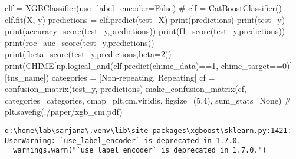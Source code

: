 \documentclass[
  letterpaper,
  DIV=11,
  numbers=noendperiod]{scrartcl}
\newenvironment{Shaded}{\begin{snugshade}}{\end{snugshade}}
\newcommand{\BuiltInTok}[1]{\textcolor[rgb]{0.00,0.23,0.31}{#1}}
\newcommand{\CommentTok}[1]{\textcolor[rgb]{0.37,0.37,0.37}{#1}}
\newcommand{\DecValTok}[1]{\textcolor[rgb]{0.68,0.00,0.00}{#1}}
\newcommand{\NormalTok}[1]{\textcolor[rgb]{0.00,0.23,0.31}{#1}}
\newcommand{\OperatorTok}[1]{\textcolor[rgb]{0.37,0.37,0.37}{#1}}
\newcommand{\StringTok}[1]{\textcolor[rgb]{0.13,0.47,0.30}{#1}}
\newcommand{\VariableTok}[1]{\textcolor[rgb]{0.07,0.07,0.07}{#1}}
\begin{document}
\begin{Shaded}
\begin{Highlighting}[]
\NormalTok{clf }\OperatorTok{=}\NormalTok{ XGBClassifier(use\_label\_encoder}\OperatorTok{=}\VariableTok{False}\NormalTok{)}
\CommentTok{\# clf = CatBoostClassifier()}
\NormalTok{clf.fit(X, y)}
\NormalTok{predictions }\OperatorTok{=}\NormalTok{ clf.predict(test\_X)}
\BuiltInTok{print}\NormalTok{(predictions)}
\BuiltInTok{print}\NormalTok{(test\_y)}
\BuiltInTok{print}\NormalTok{(accuracy\_score(test\_y,predictions))}
\BuiltInTok{print}\NormalTok{(f1\_score(test\_y,predictions))}
\BuiltInTok{print}\NormalTok{(roc\_auc\_score(test\_y,predictions))}
\BuiltInTok{print}\NormalTok{(fbeta\_score(test\_y,predictions,beta}\OperatorTok{=}\DecValTok{2}\NormalTok{))}
\BuiltInTok{print}\NormalTok{(CHIME[np.logical\_and(clf.predict(chime\_data)}\OperatorTok{==}\DecValTok{1}\NormalTok{, chime\_target}\OperatorTok{==}\DecValTok{0}\NormalTok{)][}\StringTok{\textquotesingle{}tns\_name\textquotesingle{}}\NormalTok{])}
\NormalTok{categories }\OperatorTok{=}\NormalTok{ [}\StringTok{\textquotesingle{}Non{-}repeating\textquotesingle{}}\NormalTok{, }\StringTok{\textquotesingle{}Repeating\textquotesingle{}}\NormalTok{]}
\NormalTok{cf }\OperatorTok{=}\NormalTok{ confusion\_matrix(test\_y, predictions)}
\NormalTok{make\_confusion\_matrix(cf, }
\NormalTok{                      categories}\OperatorTok{=}\NormalTok{categories,}
\NormalTok{                      cmap}\OperatorTok{=}\NormalTok{plt.cm.viridis,}
\NormalTok{                      figsize}\OperatorTok{=}\NormalTok{(}\DecValTok{5}\NormalTok{,}\DecValTok{4}\NormalTok{),}
\NormalTok{                      sum\_stats}\OperatorTok{=}\VariableTok{None}\NormalTok{)}
\CommentTok{\# plt.savefig(\textquotesingle{}./paper/xgb\_cm.pdf\textquotesingle{})}
\end{Highlighting}
\end{Shaded}

\begin{verbatim}
d:\home\lab\sarjana\.venv\lib\site-packages\xgboost\sklearn.py:1421: UserWarning: `use_label_encoder` is deprecated in 1.7.0.
  warnings.warn("`use_label_encoder` is deprecated in 1.7.0.")
\end{verbatim}
\end{document}
